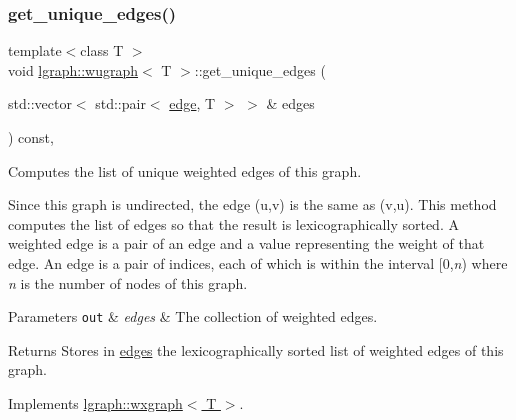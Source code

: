 \subsubsection{\texorpdfstring{get\+\_\+unique\+\_\+edges()}{get\_unique\_edges()}\hspace{0.1cm}{\footnotesize\ttfamily [1/2]}}
{\footnotesize\ttfamily template$<$class T $>$ \\
void \hyperlink{classlgraph_1_1wugraph}{lgraph\+::wugraph}$<$ T $>$\+::get\+\_\+unique\+\_\+edges (\begin{DoxyParamCaption}\item[{std\+::vector$<$ std\+::pair$<$ \hyperlink{namespacelgraph_a76bd7d50719f03de7a85db259d80d572}{edge}, T $>$ $>$ \&}]{edges }\end{DoxyParamCaption}) const\hspace{0.3cm}{\ttfamily [protected]}, {\ttfamily [virtual]}}



Computes the list of unique weighted edges of this graph. 

Since this graph is undirected, the edge (u,v) is the same as (v,u). This method computes the list of edges so that the result is lexicographically sorted. A weighted edge is a pair of an edge and a value representing the weight of that edge. An edge is a pair of indices, each of which is within the interval \mbox{[}0,{\itshape n}) where {\itshape n} is the number of nodes of this graph.


\begin{DoxyParams}[1]{Parameters}
\mbox{\tt out}  & {\em edges} & The collection of weighted edges. \\
\hline
\end{DoxyParams}
\begin{DoxyReturn}{Returns}
Stores in \hyperlink{classlgraph_1_1wxgraph_a1b89f56544185e33d54e72a8ed19a789}{edges} the lexicographically sorted list of weighted edges of this graph. 
\end{DoxyReturn}


Implements \hyperlink{classlgraph_1_1wxgraph_a50a9be174538c50c0f2a7ebeaa34ca4d}{lgraph\+::wxgraph$<$ T $>$}.

\mbox{\label{classlgraph_1_1wugraph_a455d1df8d3799b70a23b5b9944cbafb7}} 
